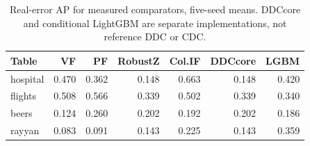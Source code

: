 \begin{table}[t]
\centering\small
\setlength{\tabcolsep}{3.5pt}
\caption{Real-error AP for measured comparators, five-seed means. DDCcore and conditional LightGBM are separate implementations, not reference DDC or CDC.}
\label{tab:baselines}
\begin{tabular}{lrrrrrr}
\toprule
Table & VF & PF & RobustZ & Col.IF & DDCcore & LGBM \\
\midrule
hospital & 0.470 & 0.362 & 0.148 & 0.663 & 0.148 & 0.420 \\
flights & 0.508 & 0.566 & 0.339 & 0.502 & 0.339 & 0.340 \\
beers & 0.124 & 0.260 & 0.202 & 0.192 & 0.202 & 0.186 \\
rayyan & 0.083 & 0.091 & 0.143 & 0.225 & 0.143 & 0.359 \\
\bottomrule
\end{tabular}
\end{table}
